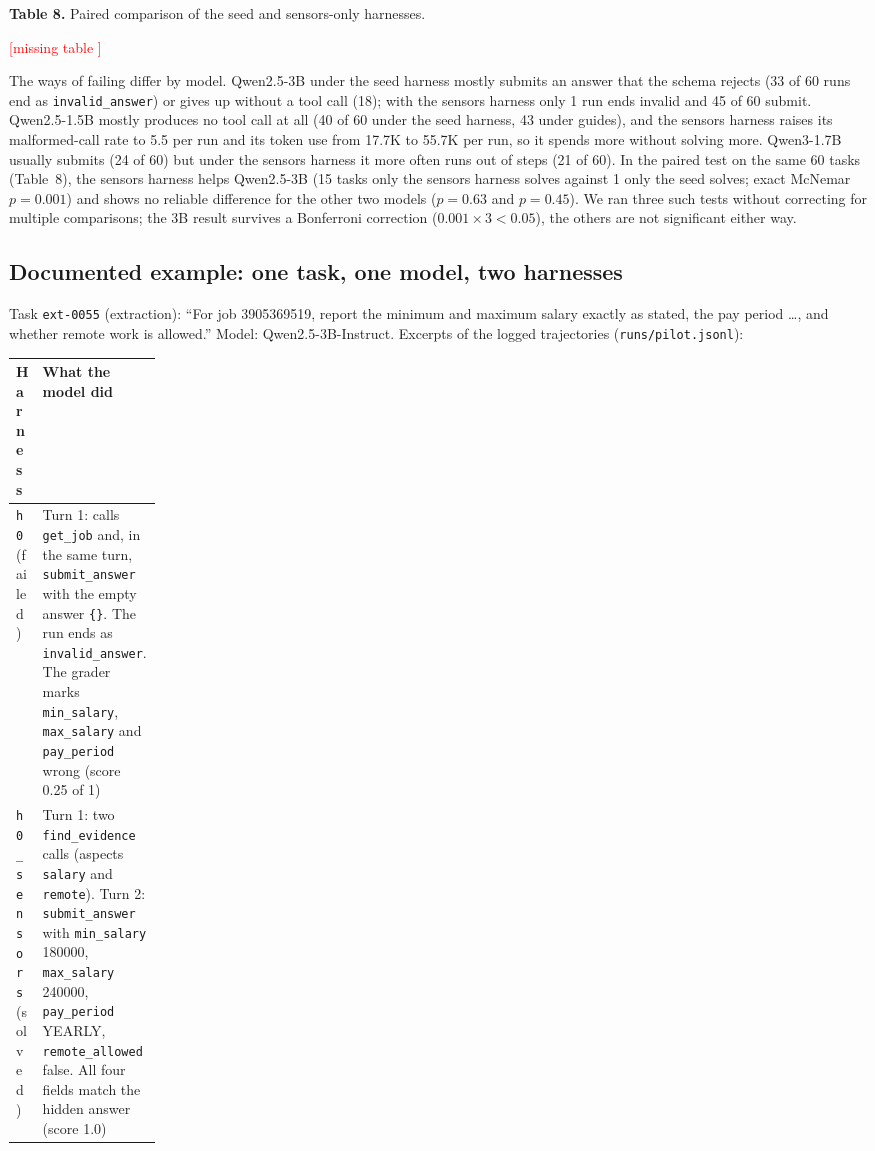 \documentclass[11pt]{article}
\newcommand{\fillin}[1]{\textcolor{red}{[#1]}}
\newcommand{\resulttable}[1]{%
  \IfFileExists{tables/#1.tex}%
    {}%
    {\fillin{missing table \detokenize{#1}}}}
\begin{document}
\textbf{Table 8.} Paired comparison of the seed and sensors-only harnesses.\par
\resulttable{compare}

The ways of failing differ by model. Qwen2.5-3B under the seed harness mostly submits an answer that the schema rejects (33 of 60 runs end as \texttt{invalid\_answer}) or gives up without a tool call (18); with the sensors harness only 1 run ends invalid and 45 of 60 submit. Qwen2.5-1.5B mostly produces no tool call at all (40 of 60 under the seed harness, 43 under guides), and the sensors harness raises its malformed-call rate to 5.5 per run and its token use from 17.7K to 55.7K per run, so it spends more without solving more. Qwen3-1.7B usually submits (24 of 60) but under the sensors harness it more often runs out of steps (21 of 60). In the paired test on the same 60 tasks (Table~8), the sensors harness helps Qwen2.5-3B (15 tasks only the sensors harness solves against 1 only the seed solves; exact McNemar $p=0.001$) and shows no reliable difference for the other two models ($p=0.63$ and $p=0.45$). We ran three such tests without correcting for multiple comparisons; the 3B result survives a Bonferroni correction ($0.001\times3<0.05$), the others are not significant either way.

\subsection{Documented example: one task, one model, two harnesses}
Task \texttt{ext-0055} (extraction): ``For job 3905369519, report the minimum and maximum salary exactly as stated, the pay period \ldots, and whether remote work is allowed.'' Model: Qwen2.5-3B-Instruct. Excerpts of the logged trajectories (\texttt{runs/pilot.jsonl}):

{\small
\begin{tabularx}{\linewidth}{>{\raggedright\arraybackslash}p{0.17\linewidth} L}
\toprule
Harness & What the model did \\
\midrule
\texttt{h0} (failed) & Turn 1: calls \texttt{get\_job} and, in the same turn, \texttt{submit\_answer} with the empty answer \texttt{\{\}}. The run ends as \texttt{invalid\_answer}. The grader marks \texttt{min\_salary}, \texttt{max\_salary} and \texttt{pay\_period} wrong (score 0.25 of 1) \\
\texttt{h0\_sensors} (solved) & Turn 1: two \texttt{find\_evidence} calls (aspects \texttt{salary} and \texttt{remote}). Turn 2: \texttt{submit\_answer} with \texttt{min\_salary} 180000, \texttt{max\_salary} 240000, \texttt{pay\_period} YEARLY, \texttt{remote\_allowed} false. All four fields match the hidden answer (score 1.0) \\
\bottomrule
\end{tabularx}
}
\end{document}
